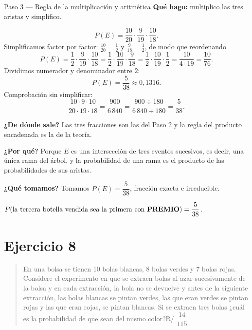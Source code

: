 \documentclass[11pt]{article}
\begin{document}
\begin{paso}{Paso 3 --- Regla de la multiplicación y aritmética}
\textbf{Qué hago:} multiplico las tres aristas y simplifico.

\[
P(E)=\frac{10}{20}\cdot\frac{9}{19}\cdot\frac{10}{18}.
\]
Simplificamos factor por factor: $\tfrac{10}{20}=\tfrac12$ y $\tfrac{9}{18}=\tfrac12$, de modo que reordenando
\[
P(E)=\frac{1}{2}\cdot\frac{9}{19}\cdot\frac{10}{18}
=\frac{1}{2}\cdot\frac{10}{19}\cdot\frac{9}{18}
=\frac{1}{2}\cdot\frac{10}{19}\cdot\frac{1}{2}
=\frac{10}{4\cdot 19}
=\frac{10}{76}.
\]
Dividimos numerador y denominador entre $2$:
\[
P(E)=\frac{5}{38}\approx 0{,}1316 .
\]
Comprobación sin simplificar:
\[
\frac{10\cdot 9\cdot 10}{20\cdot 19\cdot 18}=\frac{900}{6\,840}
=\frac{900\div 180}{6\,840\div 180}=\frac{5}{38}.
\]

\textbf{¿De dónde sale?} Las tres fracciones son las del Paso 2 y la regla del producto encadenada es la de la teoría.

\textbf{¿Por qué?} Porque $E$ es una intersección de tres eventos sucesivos, es decir, una única rama del árbol, y la probabilidad de una rama es el producto de las probabilidades de sus aristas.

\textbf{¿Qué tomamos?} Tomamos $P(E)=\dfrac{5}{38}$, fracción exacta e irreducible.
\end{paso}

\begin{resp}
$P(\text{la tercera botella vendida sea la primera con \textbf{PREMIO}})=\dfrac{5}{38}$.
\end{resp}

\section*{Ejercicio 8}

\begin{quote}
En una bolsa se tienen 10 bolas blancas, 8 bolas verdes y 7 bolas rojas. Considere el experimento en que se extraen bolas al azar sucesivamente de la bolsa y en cada extracción, la bola no se devuelve y antes de la siguiente extracción, las bolas blancas se pintan verdes, las que eran verdes se pintan rojas y las que eran rojas, se pintan blancas. Si se extraen tres bolas ¿cuál es la probabilidad de que sean del mismo color?\hfill R/ $\dfrac{14}{115}$
\end{quote}
\end{document}
